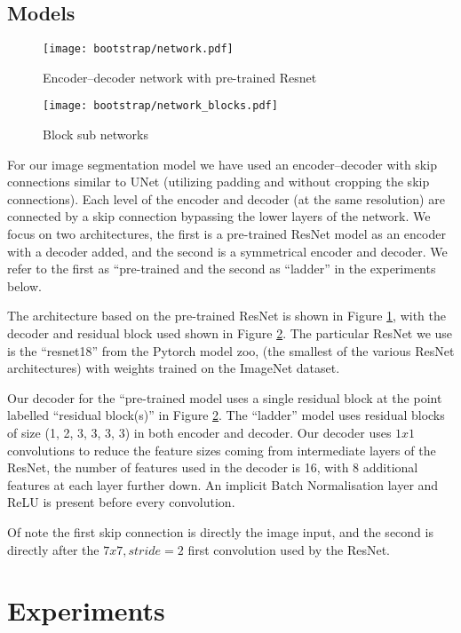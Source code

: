 \subsection {Models}

\begin{figure}[h]
  \centering
  \texttt{[image: bootstrap/network.pdf]}
  \caption{Encoder--decoder network with pre-trained Resnet}  
  \label{fig:network}
\end{figure}
\begin{figure}
  \centering
  \texttt{[image: bootstrap/network\_blocks.pdf]}
  \caption{Block sub networks}  
  \label{fig:decode_block}
\end{figure}

For our image segmentation model we have used an encoder--decoder with skip connections similar to UNet \cite{Ronneberger2015} (utilizing padding and without cropping the skip connections). Each level of the encoder and decoder (at the same resolution) are connected by a skip connection bypassing the lower layers of the network. We focus on two architectures, the first is a pre-trained ResNet model as an encoder with a decoder added, and the second is a symmetrical encoder and decoder. We refer to the first as ``pre-trained and the second as ``ladder'' in the experiments below.

The architecture based on the pre-trained ResNet is shown in Figure \ref{fig:network}, with the decoder and residual block used shown in Figure \ref{fig:decode_block}. The particular ResNet we use is the ``resnet18'' from the Pytorch model zoo, (the smallest of the various ResNet architectures) with weights trained on the ImageNet dataset. 

Our decoder for the ``pre-trained model uses a single residual block at the point labelled ``residual block(s)'' in Figure \ref{fig:decode_block}. The ``ladder'' model uses residual blocks of size (1, 2, 3, 3, 3, 3) in both encoder and decoder. Our decoder uses $ 1x1 $ convolutions to reduce the feature sizes coming from intermediate layers of the ResNet, the number of features used in the decoder is 16, with 8 additional features at each layer further down. An implicit Batch Normalisation layer and ReLU is present before every convolution.

Of note the first skip connection is directly the image input, and the second is directly after the $7x7, stride=2$ first convolution used by the ResNet.


\section {Experiments}


